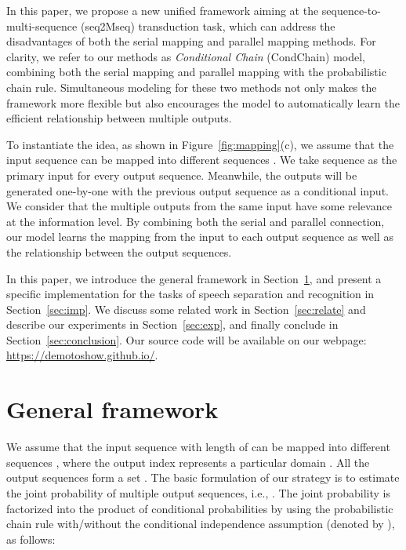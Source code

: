 \documentclass{article}
\begin{document}
In this paper, we propose a new unified framework aiming at the sequence-to-multi-sequence (seq2Mseq) transduction task, which can address the disadvantages of both the serial mapping and parallel mapping methods.
For clarity, we refer to our methods as \textit{Conditional Chain} (CondChain) model, combining both the serial mapping and parallel mapping with the probabilistic chain rule. Simultaneous modeling for these two methods not only makes the framework more flexible but also encourages the model to automatically learn the efficient relationship between multiple outputs.

To instantiate the idea, as shown in Figure~\ref{fig:mapping}(c), we assume that the input sequence  can be mapped into  different sequences . 
We take sequence  as the primary input for every output sequence. Meanwhile, the outputs will be generated one-by-one with the previous output sequence as a conditional input. 
We consider that the multiple outputs from the same input have some relevance at the information level. By combining both the serial and parallel connection, our model learns the mapping from the input to each output sequence as well as the relationship between the output sequences. 

In this paper, we introduce 
the general framework in Section~\ref{sec:framework}, and present a specific implementation for the tasks of speech separation and recognition in Section~\ref{sec:imp}. We discuss some related work in Section~\ref{sec:relate} and describe our experiments in Section~\ref{sec:exp}, and finally conclude in Section~\ref{sec:conclusion}. Our source code will be available on our webpage:  \url{https://demotoshow.github.io/}.

\section{General framework}\label{sec:framework}
We assume that the input sequence  with length of  can be mapped into  different sequences , where the output index  represents a particular domain . All the output sequences form a set . The basic formulation of our strategy is to estimate the joint probability of multiple output sequences, i.e., . The joint probability is factorized into the product of conditional probabilities by using the probabilistic chain rule with/without the conditional independence assumption (denoted by \hbox{\sout{}}), as follows:
\vspace{-0.1cm}
\end{document}
